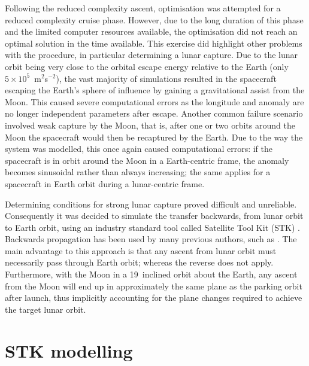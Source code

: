 
Following the reduced complexity ascent, optimisation was attempted for a reduced complexity cruise phase. However, due to the long duration of this phase and the limited computer resources available, the optimisation did not reach an optimal solution in the time available. This exercise did highlight other problems with the procedure, in particular determining a lunar capture. Due to the lunar orbit being very close to the orbital escape energy relative to the Earth (only $5\times10^5$~m$^2$s$^{-2}$), the vast majority of simulations resulted in the spacecraft escaping the Earth's sphere of influence by gaining a gravitational assist from the Moon. This caused severe computational errors as the longitude and anomaly are no longer independent parameters after escape. Another common failure scenario involved weak capture by the Moon, that is, after one or two orbits around the Moon the spacecraft would then be recaptured by the Earth. Due to the way the system was modelled, this once again caused computational errors: if the spacecraft is in orbit around the Moon in a Earth-centric frame, the anomaly becomes sinusoidal rather than always increasing; the same applies for a spacecraft in Earth orbit during a lunar-centric frame.

Determining conditions for strong lunar capture proved difficult and unreliable. Consequently it was decided to simulate the transfer backwards, from lunar orbit to Earth orbit, using an industry standard tool called Satellite Tool Kit (STK) \parencite{STK}. Backwards propagation has been used by many previous authors, such as \textcite{Author}. The main advantage to this approach is that any ascent from lunar orbit must necessarily pass through Earth orbit; whereas the reverse does not apply. Furthermore, with the Moon in a 19\degrees\ inclined orbit about the Earth, any ascent from the Moon will end up in approximately the same plane as the parking orbit after launch, thus implicitly accounting for the plane changes required to achieve the target lunar orbit.

\clearpage


\section{STK modelling} \label{sec:STK}

